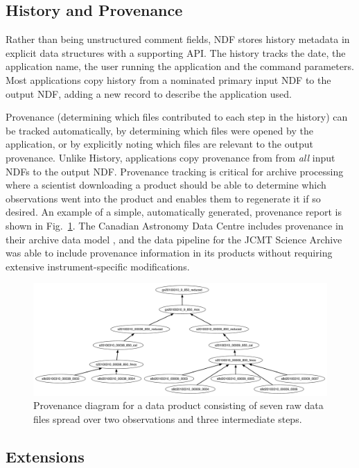 \documentclass[11pt,twoside]{article}
\begin{document}
\subsection{History and Provenance}

Rather than being unstructured comment fields, NDF stores history
metadata in explicit data structures with a supporting API. The
history tracks the date, the application name, the user running the
application and the command parameters. Most applications copy history
from a nominated primary input NDF to the output NDF, adding a new
record to describe the application used.

Provenance (determining which files contributed to each step in the
history) can be tracked automatically, by determining which files were
opened by the application, or by explicitly noting which files are
relevant to the output provenance. Unlike History, applications copy
provenance from from \emph{all} input NDFs to the output
NDF. Provenance tracking is critical for archive processing where a
scientist downloading a product should be able to determine which
observations went into the product and enables them to regenerate it
if so desired. An example of a simple, automatically generated,
provenance report is shown in Fig.\ \ref{fig:P91_f1}. The Canadian
Astronomy Data Centre includes provenance in their archive data model
\citep[CAOM;][]{2012ASPC..461..339D,2013ASPC..475..159R}, and the data
pipeline for the JCMT Science Archive \citep{2008ASPC..394..565J} was
able to include provenance information in its products without
requiring extensive instrument-specific modifications.

\begin{figure}
\includegraphics[width=\textwidth]{P91_f1}
\caption{Provenance diagram for a data product consisting of seven raw
  data files spread over two observations and three intermediate steps.}
\label{fig:P91_f1}
\end{figure}

\subsection{Extensions}
\end{document}

